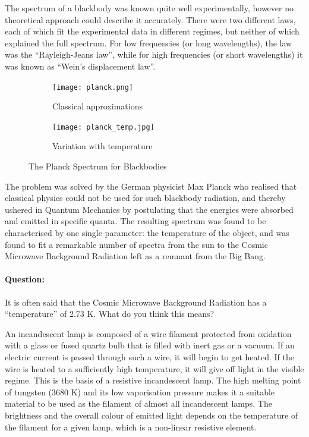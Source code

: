 \begin{refsection}


The spectrum of a blackbody was known quite well experimentally, however no theoretical approach could describe it accurately. There were two different laws, each of which fit the experimental data in different regimes, but neither of which explained the full spectrum. For low frequencies (or long wavelengths), the law was the ``Rayleigh-Jeans law'', while for high frequencies (or short wavelengths) it was known as ``Wein's displacement law''.

\begin{figure}[!htb]
\centering
\begin{subfigure}[b]{0.45\textwidth}
        \texttt{[image: planck.png]}
        \caption{Classical approximations}
        \label{planck_approx}
    \end{subfigure}%
    \begin{subfigure}[b]{0.45\textwidth}
        \hspace{0.5cm}\texttt{[image: planck\_temp.jpg]}
        \caption{Variation with temperature}
        \label{planck_temp}
    \end{subfigure}
\caption{The Planck Spectrum for Blackbodies}
\label{planck}
\end{figure}

The problem was solved by the German physicist Max Planck who realised that classical physics could not be used for such blackbody radiation, and thereby ushered in Quantum Mechanics by postulating that the energies were absorbed and emitted in specific quanta. The resulting spectrum was found to be characterised by one single parameter: the temperature of the object, and was found to fit a remarkable number of spectra from the sun to the Cosmic Microwave Background Radiation left as a remnant from the Big Bang.

\begin{question}
\paragraph{Question: } It is often said that the Cosmic Microwave Background Radiation has a ``temperature'' of 2.73 K. What do you think this means?
\end{question}


An incandescent lamp is composed of a wire filament protected from oxidation with a glass or fused quartz bulb that is filled with inert gas or a vacuum. If an electric current is passed through such a wire, it will begin to get heated. If the wire is heated to a sufficiently high temperature, it will give off light in the visible regime.  This is the basis of a resistive incandescent lamp. The high melting point of tungsten (3680 K) and its low vaporisation pressure makes it a suitable material to be used as the filament of almost all incandescent lamps. The brightness and the overall colour of emitted light depends on the temperature of the filament for a given lamp, which is a non-linear resistive element.


\end{refsection}
